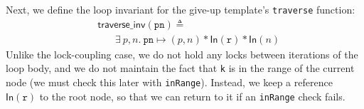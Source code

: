 \documentclass[sigplan,screen]{acmart}
\newcommand{\treerep}{\ensuremath{\mathsf{Abs}}}
\newcommand{\inFP}{\ensuremath{\mathsf{In }}}
\newcommand{\wm}[1]{\textbf{\textcolor{violet}{[William: #1]}}}
\begin{document}
{%


Next, we define the loop invariant for the give-up template's \texttt{traverse} function:
\begin{align*} &\mathsf{traverse\_inv}(\texttt{pn}) \triangleq \\  & \ \ \ \ \ \ \ \ \exists \ p, n.\ \texttt{pn} \mapsto (p, n) \ast  \inFP (\texttt{r}) \ast \inFP (n)
\end{align*}
Unlike the lock-coupling case, we do not hold any locks between iterations of the loop body, and we do not maintain the fact that \lstinline{k} is in the range of the current node (we must check this later with \lstinline{inRange}). Instead, we keep a reference $\inFP(\texttt{r})$ to the root node, so that we can return to it if an \lstinline{inRange} check fails.

}
\end{document}
